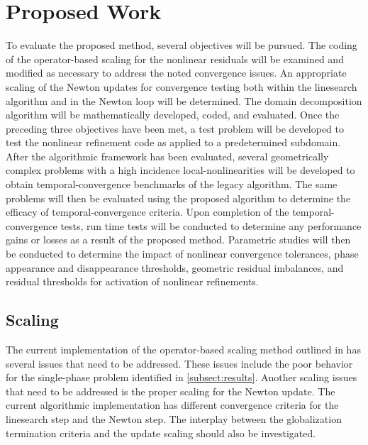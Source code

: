 \chapter{Proposed Work}
\label{chap:proposal}
To evaluate the proposed method, several objectives will be pursued.
The coding of the operator-based scaling for the nonlinear residuals will be examined and modified as necessary to address the noted convergence issues.
An appropriate scaling of the Newton updates for convergence testing both within the linesearch algorithm and in the Newton loop will be determined.
The domain decomposition algorithm will be mathematically developed, coded, and evaluated.
Once the preceding three objectives have been met, a test problem will be developed to test the nonlinear refinement code as applied to a predetermined subdomain.
After the algorithmic framework has been evaluated, several geometrically complex problems with a high incidence local-nonlinearities will be developed to obtain temporal-convergence benchmarks of the legacy algorithm.
The same problems will then be evaluated using the proposed algorithm to determine the efficacy of temporal-convergence criteria.
Upon completion of the temporal-convergence tests, run time tests will be conducted to determine any performance gains or losses as a result of the proposed method.
Parametric studies will then be conducted to determine the impact of nonlinear convergence tolerances, phase appearance and disappearance thresholds, geometric residual imbalances, and residual thresholds for activation of nonlinear refinements.

\section{Scaling}
\label{sect:proposal_scaling}
The current implementation of the operator-based scaling method outlined in  has several issues that need to be addressed.
These issues include the poor behavior for the single-phase problem identified in \ref{subsect:results}.
Another scaling issues that need to be addressed is the proper scaling for the Newton update.
The current algorithmic implementation has different convergence criteria for the linesearch step and the Newton step.
The interplay between the globalization termination criteria and the update scaling should also be investigated. 

